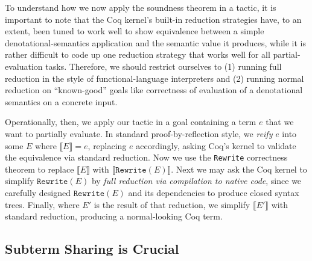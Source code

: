 \documentclass[sigplan,10pt,review,anonymous]{acmart}\settopmatter{printfolios=true,printccs=false,printacmref=false}
\begin{document}
To understand how we now apply the soundness theorem in a tactic, it is important to note that the Coq kernel's built-in reduction strategies have, to an extent, been tuned to work well to show equivalence between a simple denotational-semantics application and the semantic value it produces, while it is rather difficult to code up one reduction strategy that works well for all partial-evaluation tasks.
Therefore, we should restrict ourselves to (1) running full reduction in the style of functional-language interpreters and (2) running normal reduction on ``known-good'' goals like correctness of evaluation of a denotational semantics on a concrete input.

Operationally, then, we apply our tactic in a goal containing a term $e$ that we want to partially evaluate.
In standard proof-by-reflection style, we \emph{reify} $e$ into some $E$ where $\llbracket E \rrbracket = e$, replacing $e$ accordingly, asking Coq's kernel to validate the equivalence via standard reduction.
Now we use the \texttt{Rewrite} correctness theorem to replace $\llbracket E \rrbracket$ with $\llbracket \texttt{Rewrite}(E) \rrbracket$.
Next we may ask the Coq kernel to simplify $\texttt{Rewrite}(E)$ by \emph{full reduction via compilation to native code}, since we carefully designed $\texttt{Rewrite}(E)$ and its dependencies to produce closed syntax trees.
Finally, where $E'$ is the result of that reduction, we simplify $\llbracket E' \rrbracket$ with standard reduction, producing a normal-looking Coq term.


\subsection{Subterm Sharing is Crucial} \label{sec:under-lets}
\end{document}
